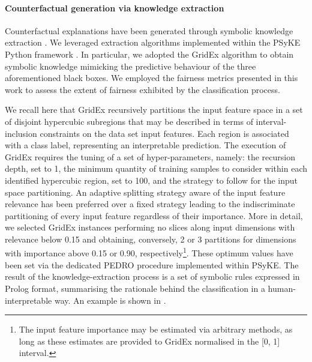 \documentclass[letterpaper]{article} %
\begin{document}
\paragraph{Counterfactual generation via knowledge extraction}

Counterfactual explanations have been generated through symbolic knowledge extraction \cite{SKESKISLR2024}.
%
We leveraged extraction algorithms implemented within the PSyKE Python framework \cite{psyke-trust-aixia2022}. In particular, we adopted the GridEx algorithm to obtain symbolic knowledge mimicking the predictive behaviour of the three aforementioned black boxes.%
%
We employed the fairness metrics presented in this work to assess the extent of fairness exhibited by the classification process.

We recall here that GridEx recursively partitions the input feature space in a set of disjoint hypercubic subregions that may be described in terms of interval-inclusion constraints on the data set input features.
Each region is associated with a class label, representing an interpretable prediction.
The execution of GridEx requires the tuning of a set of hyper-parameters, namely: the recursion depth, set to 1, the minimum quantity of training samples to consider within each identified hypercubic region, set to 100, and the strategy to follow for the input space partitioning.
%
An adaptive splitting strategy aware of the input feature relevance has been preferred over a fixed strategy leading to the indiscriminate partitioning of every input feature regardless of their importance. More in detail, we selected GridEx instances performing no slices along input dimensions with relevance below 0.15 and obtaining, conversely, 2 or 3 partitions for dimensions with importance above 0.15 or 0.90, respectively\footnote{The input feature importance may be estimated via arbitrary methods, as long as these estimates are provided to GridEx normalised in the [0, 1] interval.}.
%
These optimum values have been set via the dedicated PEDRO procedure implemented within PSyKE. %
%
The result of the knowledge-extraction process is a set of symbolic rules expressed in Prolog format, summarising the rationale behind the classification in a human-interpretable way.
%
An example is shown in .
\end{document}
